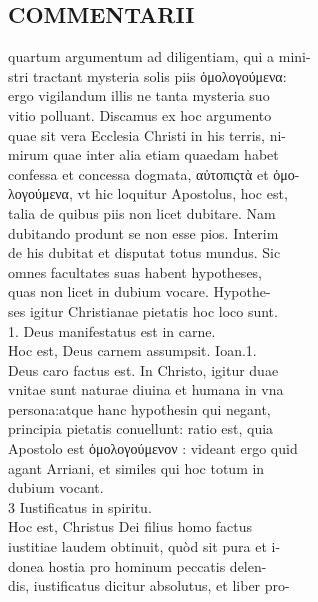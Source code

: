 \documentclass{article}
\begin{document}
\begin{pages}
\section*{COMMENTARII \\
                }quartum argumentum ad diligentiam, qui a mini- \\
                stri tractant mysteria solis piis ὁμολογούμενα: \\
                ergo vigilandum illis ne tanta mysteria suo \\
                vitio polluant. Discamus ex hoc argumento \\
                quae sit vera Ecclesia Christi in his terris, ni- \\
                mirum quae inter alia etiam quaedam habet \\
                confessa et concessa dogmata, αὐτοπιςτὰ et ὁμο- \\
                λογούμενα, vt hic loquitur Apostolus, hoc est, \\
                talia de quibus piis non licet dubitare. Nam \\
                dubitando produnt se non esse pios. Interim \\
                de his dubitat et disputat totus mundus. Sic \\
                omnes facultates suas habent hypotheses, \\
                quas non licet in dubium vocare. Hypothe- \\
                ses igitur Christianae pietatis hoc loco sunt. \\
                1. Deus manifestatus est in carne. \\
                Hoc est, Deus carnem assumpsit. Ioan.1. \\
                Deus caro factus est. In Christo, igitur duae \\
                vnitae sunt naturae diuina et humana in vna \\
                persona:atque hanc hypothesin qui negant, \\
                principia pietatis conuellunt: ratio est, quia \\
                Apostolo est ὁμολογούμενον : videant ergo quid \\
                agant Arriani, et similes qui hoc totum in \\
                dubium vocant. \\
                3 Iustificatus in spiritu. \\
                Hoc est, Christus Dei filius homo factus \\
                iustitiae laudem obtinuit, quòd sit pura et i- \\
                donea hostia pro hominum peccatis delen- \\
                dis, iustificatus dicitur absolutus, et liber pro- \\
                

\end{pages}
\end{document}
